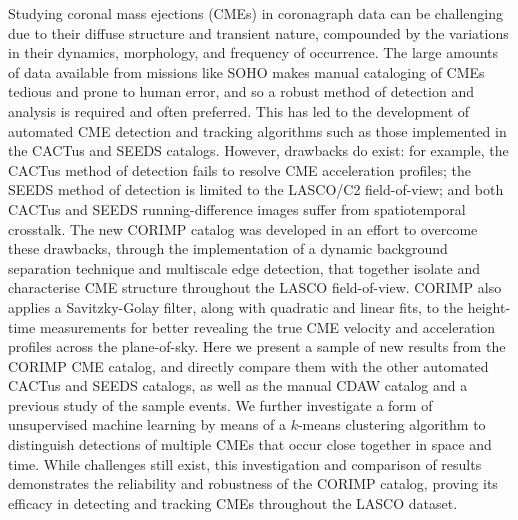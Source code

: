 \documentclass[referee,a4paper,12pt,traditabstract]{swsc}
\begin{document}
\begin{linenumbers}
  \abstract
  {
  Studying coronal mass ejections (CMEs) in coronagraph data can be challenging due to their diffuse structure and transient nature, compounded by the variations in their dynamics, morphology, and frequency of occurrence. The large amounts of data available from missions like SOHO makes manual cataloging of CMEs tedious and prone to human error, and so a robust method of detection and analysis is required and often preferred. This has led to the development of automated CME detection and tracking algorithms such as those implemented in the CACTus and SEEDS catalogs. However, drawbacks do exist: for example, the CACTus method of detection fails to resolve CME acceleration profiles; the SEEDS method of detection is limited to the LASCO/C2 field-of-view; and both CACTus and SEEDS running-difference images suffer from spatiotemporal crosstalk. The new CORIMP catalog was developed in an effort to overcome these drawbacks, through the implementation of a dynamic background separation technique and multiscale edge detection, that together isolate and characterise CME structure throughout the LASCO field-of-view. CORIMP also applies a Savitzky-Golay filter, along with quadratic and linear fits, to the height-time measurements for better revealing the true CME velocity and acceleration profiles across the plane-of-sky. Here we present a sample of new results from the CORIMP CME catalog, and directly compare them with the other automated CACTus and SEEDS catalogs, as well as the manual CDAW catalog and a previous study of the sample events. We further investigate a form of unsupervised machine learning by means of a $k$-means clustering algorithm to distinguish detections of multiple CMEs that occur close together in space and time. While challenges still exist, this investigation and comparison of results demonstrates the reliability and robustness of the CORIMP catalog, proving its efficacy in detecting and tracking CMEs throughout the LASCO dataset.
  }
  
   
   
   
   
   

\end{linenumbers}
\end{document}

